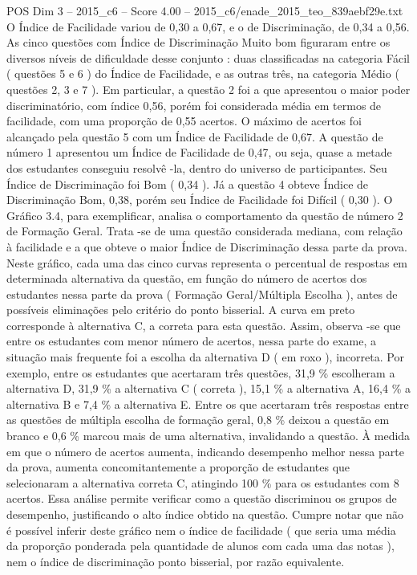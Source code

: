 \begin{textsample}{POS Dim 3 – 2015\_c6 – Score 4.00 – 2015\_c6/enade\_2015\_teo\_839aebf29e.txt}
O Índice de Facilidade variou de 0,30 a 0,67, e o de Discriminação, de 0,34 a 0,56.
As cinco questões com Índice de Discriminação Muito bom figuraram entre os diversos níveis de dificuldade desse conjunto : duas classificadas na categoria Fácil ( questões 5 e 6 ) do Índice de Facilidade, e as outras três, na categoria Médio ( questões 2, 3 e 7 ).
Em particular, a questão 2 foi a que apresentou o maior poder discriminatório, com índice 0,56, porém foi considerada média em termos de facilidade, com uma proporção de 0,55 acertos.
O máximo de acertos foi alcançado pela questão 5 com um Índice de Facilidade de 0,67.
A questão de número 1 apresentou um Índice de Facilidade de 0,47, ou seja, quase a metade dos estudantes conseguiu resolvê -la, dentro do universo de participantes.
Seu Índice de Discriminação foi Bom ( 0,34 ).
Já a questão 4 obteve Índice de Discriminação Bom, 0,38, porém seu Índice de Facilidade foi Difícil ( 0,30 ).
O Gráfico 3.4, para exemplificar, analisa o comportamento da questão de número 2 de Formação Geral.
Trata -se de uma questão considerada mediana, com relação à facilidade e a que obteve o maior Índice de Discriminação dessa parte da prova.
Neste gráfico, cada uma das cinco curvas representa o percentual de respostas em determinada alternativa da questão, em função do número de acertos dos estudantes nessa parte da prova ( Formação Geral/Múltipla Escolha ), antes de possíveis eliminações pelo critério do ponto bisserial.
A curva em preto corresponde à alternativa C, a correta para esta questão.
Assim, observa -se que entre os estudantes com menor número de acertos, nessa parte do exame, a situação mais frequente foi a escolha da alternativa D ( em roxo ), incorreta.
Por exemplo, entre os estudantes que acertaram três questões, 31,9 \% escolheram a alternativa D, 31,9 \% a alternativa C ( correta ), 15,1 \% a alternativa A, 16,4 \% a alternativa B e 7,4 \% a alternativa E.
Entre os que acertaram três respostas entre as questões de múltipla escolha de formação geral, 0,8 \% deixou a questão em branco e 0,6 \% marcou mais de uma alternativa, invalidando a questão.
À medida em que o número de acertos aumenta, indicando desempenho melhor nessa parte da prova, aumenta concomitantemente a proporção de estudantes que selecionaram a alternativa correta C, atingindo 100 \% para os estudantes com 8 acertos.
Essa análise permite verificar como a questão discriminou os grupos de desempenho, justificando o alto índice obtido na questão.
Cumpre notar que não é possível inferir deste gráfico nem o índice de facilidade ( que seria uma média da proporção ponderada pela quantidade de alunos com cada uma das notas ), nem o índice de discriminação ponto bisserial, por razão equivalente.

\end{textsample}
